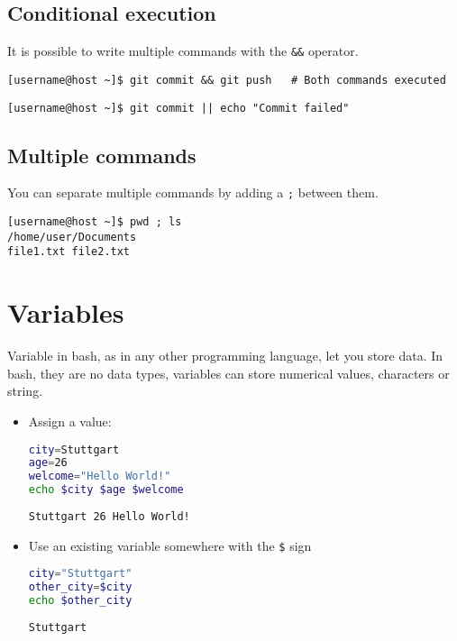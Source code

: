 \documentclass{article}
\newcommand{\inlinecode}[1]{\colorbox{backcolour}{\footnotesize{\texttt{#1}}}}
\begin{document}
\subsection{Conditional execution}

It is possible to write multiple commands with the \inlinecode{\&\&} operator.

\begin{lstlisting}[style=terminal]
[username@host ~]$ git commit && git push   # Both commands executed
\end{lstlisting}

\begin{lstlisting}[style=terminal]
[username@host ~]$ git commit || echo "Commit failed"
\end{lstlisting}

\subsection{Multiple commands}
You can separate multiple commands by adding a \inlinecode{;} between them.

\begin{lstlisting}[style=terminal]
[username@host ~]$ pwd ; ls
/home/user/Documents
file1.txt file2.txt
\end{lstlisting}

\section{Variables}

Variable in bash, as in any other programming language, let you store data. In bash, they are no data types, variables can store numerical values, characters or string.

\begin{itemize}
	\item Assign a value:
	      \begin{lstlisting}[style=command, language=bash]
city=Stuttgart
age=26
welcome="Hello World!"
echo $city $age $welcome
\end{lstlisting}

	      \begin{lstlisting}[style=terminal]
Stuttgart 26 Hello World!
\end{lstlisting}

	\item Use an existing variable somewhere with the \inlinecode{\$} sign

	      \begin{lstlisting}[style=command, language=bash]
city="Stuttgart"
other_city=$city
echo $other_city
\end{lstlisting}

	      \begin{lstlisting}[style=terminal]
Stuttgart
\end{lstlisting}

\end{itemize}
\end{document}
